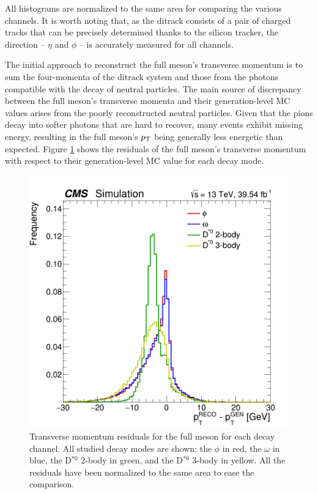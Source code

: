 All histograms are normalized to the same area for comparing the various channels. It is worth noting that, as the ditrack consists of a pair of charged tracks that can be precisely determined thanks to the silicon tracker, the direction -- $\eta$ and $\phi$ -- is accurately measured for all channels.

The initial approach to reconstruct the full meson's transverse momentum is to sum the four-momenta of the ditrack system and those from the photons compatible with the decay of neutral particles. The main source of discrepancy between the full meson's transverse momenta and their generation-level MC values arises from the poorly reconstructed neutral particles. Given that the pions decay into softer photons that are hard to recover, many events exhibit missing energy, resulting in the full meson's $p_\text{T}$ being generally less energetic than expected. Figure \ref{fig:fullmeson_residuals_pt} shows the residuals of the full meson's transverse momentum with respect to their generation-level MC value for each decay mode.
\begin{figure}[!ht]
    \captionsetup[subfigure]{labelformat=empty}
    \vspace*{-0.2cm}
    \centering
    \setlength{\mylength}{\textwidth}
    \includegraphics[width=0.49\mylength]{resources/plots/fullmeson_residuals_pt.png}
    \caption{Transverse momentum residuals for the full meson for each decay channel. All studied decay modes are shown: the $\phi$ in red, the $\omega$ in blue, the D$^{*0}$ 2-body in green, and the D$^{*0}$ 3-body in yellow. All the residuals have been normalized to the same area to ease the comparison.}
    \label{fig:fullmeson_residuals_pt}
    \vspace*{-0.0cm}
\end{figure}
